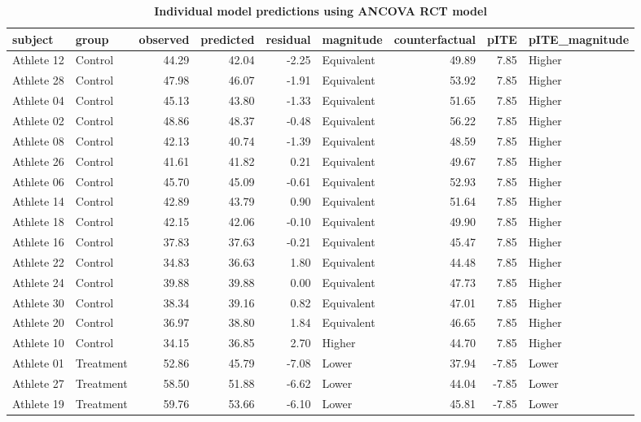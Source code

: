 \documentclass[
]{book}
\begin{document}
\begin{table}

\caption{\label{tab:ancova-rct-pITE}\textbf{Individual model predictions using ANCOVA RCT model}}
\centering
\begin{tabular}[t]{llrrrlrrl}
\toprule
subject & group & observed & predicted & residual & magnitude & counterfactual & pITE & pITE\_magnitude\\
\midrule
Athlete 12 & Control & 44.29 & 42.04 & -2.25 & Equivalent & 49.89 & 7.85 & Higher\\
Athlete 28 & Control & 47.98 & 46.07 & -1.91 & Equivalent & 53.92 & 7.85 & Higher\\
Athlete 04 & Control & 45.13 & 43.80 & -1.33 & Equivalent & 51.65 & 7.85 & Higher\\
Athlete 02 & Control & 48.86 & 48.37 & -0.48 & Equivalent & 56.22 & 7.85 & Higher\\
Athlete 08 & Control & 42.13 & 40.74 & -1.39 & Equivalent & 48.59 & 7.85 & Higher\\
\addlinespace
Athlete 26 & Control & 41.61 & 41.82 & 0.21 & Equivalent & 49.67 & 7.85 & Higher\\
Athlete 06 & Control & 45.70 & 45.09 & -0.61 & Equivalent & 52.93 & 7.85 & Higher\\
Athlete 14 & Control & 42.89 & 43.79 & 0.90 & Equivalent & 51.64 & 7.85 & Higher\\
Athlete 18 & Control & 42.15 & 42.06 & -0.10 & Equivalent & 49.90 & 7.85 & Higher\\
Athlete 16 & Control & 37.83 & 37.63 & -0.21 & Equivalent & 45.47 & 7.85 & Higher\\
\addlinespace
Athlete 22 & Control & 34.83 & 36.63 & 1.80 & Equivalent & 44.48 & 7.85 & Higher\\
Athlete 24 & Control & 39.88 & 39.88 & 0.00 & Equivalent & 47.73 & 7.85 & Higher\\
Athlete 30 & Control & 38.34 & 39.16 & 0.82 & Equivalent & 47.01 & 7.85 & Higher\\
Athlete 20 & Control & 36.97 & 38.80 & 1.84 & Equivalent & 46.65 & 7.85 & Higher\\
Athlete 10 & Control & 34.15 & 36.85 & 2.70 & Higher & 44.70 & 7.85 & Higher\\
\addlinespace
Athlete 01 & Treatment & 52.86 & 45.79 & -7.08 & Lower & 37.94 & -7.85 & Lower\\
Athlete 27 & Treatment & 58.50 & 51.88 & -6.62 & Lower & 44.04 & -7.85 & Lower\\
Athlete 19 & Treatment & 59.76 & 53.66 & -6.10 & Lower & 45.81 & -7.85 & Lower\\

\end{tabular}
\end{table}
\end{document}

